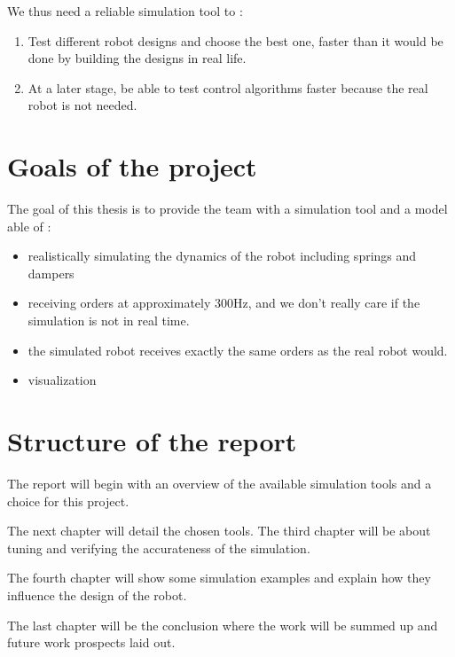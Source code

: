 We thus need a reliable simulation tool to :
\begin{enumerate}
\item Test different robot designs and choose the best one, faster than it would be done by building the designs in real life.
\item At a later stage, be able to test control algorithms faster because the real robot is not needed.
\end{enumerate}

\section{Goals of the project}
The goal of this thesis is to provide the team with a simulation tool and a model able of :
\begin{itemize}
\item realistically simulating the dynamics of the robot including springs and dampers
\item receiving orders at approximately 300Hz, and we don't really care if the simulation is not in real time.
\item the simulated robot receives exactly the same orders as the real robot would.
\item visualization
\end{itemize}

\section{Structure of the report}
The report will begin with an overview of the available simulation tools and a choice for this project.

The next chapter will detail the chosen tools. The third chapter will be about tuning and verifying the accurateness of the simulation.

The fourth chapter will show some simulation examples and explain how they influence the design of the robot.

The last chapter will be the conclusion where the work will be summed up and future work prospects laid out.